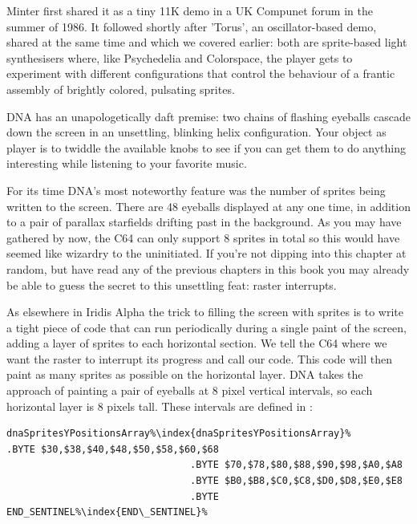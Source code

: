 Minter first shared it as a tiny 11K demo in a UK Compunet forum in the summer of 
1986. It followed shortly after 'Torus', an oscillator-based demo, shared at the same time and which we
covered earlier: both are sprite-based
light synthesisers where, like Psychedelia and Colorspace, the player gets to experiment with different
configurations that control the behaviour of a frantic assembly of brightly colored, pulsating sprites.

DNA has an unapologetically daft premise: two chains of flashing eyeballs cascade down the
screen in an unsettling, blinking helix configuration. Your object as player is to twiddle the available
knobs to see if you can get them to do anything interesting while listening to your favorite music.

For its time DNA's most noteworthy feature was the number of sprites being written to the screen. There are
48 eyeballs displayed at any one time, in addition to a pair of parallax starfields drifting past in the
background. As you may have gathered by now, the C64 can only support 8 sprites in total so this would
have seemed like wizardry to the uninitiated. If you're not dipping into this chapter at random, but have
read any of the previous chapters in this book you may already be able to guess the secret to this 
unsettling feat: raster interrupts.

As elsewhere in Iridis Alpha the trick to filling the screen with sprites is to write a tight piece of code
that can run periodically during a single paint of the screen, adding a layer of sprites to each horizontal
section. We tell the C64 where we want the raster to interrupt its progress and call our code. This code
will then paint as many sprites as possible on the horizontal layer. DNA takes the approach of painting a
pair of eyeballs at 8 pixel vertical intervals, so each horizontal layer is 8 pixels tall. 
These intervals are defined in :

\begin{lstlisting}[escapechar=\%]
dnaSpritesYPositionsArray%\index{dnaSpritesYPositionsArray}%       .BYTE $30,$38,$40,$48,$50,$58,$60,$68
                                .BYTE $70,$78,$80,$88,$90,$98,$A0,$A8
                                .BYTE $B0,$B8,$C0,$C8,$D0,$D8,$E0,$E8
                                .BYTE END_SENTINEL%\index{END\_SENTINEL}%
\end{lstlisting}

